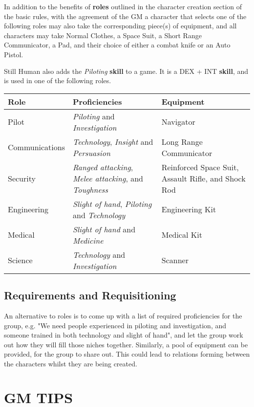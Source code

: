 \documentclass[11pt]{article}
\begin{document}
\begin{multicols}{3}
  In addition to the benefits of \textbf{roles} outlined in the character creation section of the basic rules, with the agreement of the GM a character that selects one of the following roles may also take the corresponding piece(s) of equipment, and all characters may take Normal Clothes, a Space Suit, a Short Range Communicator, a Pad, and their choice of either a combat knife or an Auto Pistol.

  Still Human also adds the \textit{Piloting} \textbf{skill} to a game. It is a DEX + INT \textbf{skill}, and is used in one of the following roles.

  \begin{tabularx}{\linewidth}{lXX}
    Role & Proficiencies & Equipment \\
    \hline
    Pilot & \textit{Piloting} and \textit{Investigation} & Navigator \\
    Communications & \textit{Technology}, \textit{Insight} and \textit{Persuasion} & Long Range Communicator \\
    Security & \textit{Ranged attacking}, \textit{Melee attacking}, and \textit{Toughness} & Reinforced Space Suit, Assault Rifle, and Shock Rod \\
    Engineering & \textit{Slight of hand}, \textit{Piloting} and \textit{Technology} & Engineering Kit \\
    Medical & \textit{Slight of hand} and \textit{Medicine} & Medical Kit \\
    Science & \textit{Technology} and \textit{Investigation} & Scanner
  \end{tabularx}

  \subsection*{Requirements and Requisitioning}

  An alternative to roles is to come up with a list of required proficiencies for the group, e.g. "We need people experienced in piloting and investigation, and someone trained in both technology and slight of hand", and let the group work out how they will fill those niches together. Similarly, a pool of equipment can be provided, for the group to share out. This could lead to relations forming between the characters whilst they are being created.

  \section*{GM TIPS}


\end{multicols}
\end{document}
